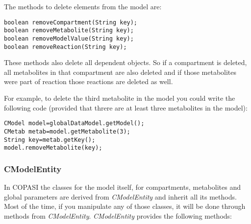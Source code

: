 \documentclass[a4,12pt]{article}
\begin{document}
The methods to delete elements from the model are:

\begin{lstlisting}
boolean removeCompartment(String key);
boolean removeMetabolite(String key);
boolean removeModelValue(String key);
boolean removeReaction(String key);
\end{lstlisting}

These methods also delete all dependent objects. So if a compartment is deleted, all metabolites in that compartment are also deleted and if those metabolites were part of reaction those reactions are deleted as well.

For example, to delete the third metabolite in the model you could write the following code (provided that threre are at least three metabolites in the model):

\begin{lstlisting}
CModel model=globalDataModel.getModel();
CMetab metab=model.getMetabolite(3);
String key=metab.getKey();
model.removeMetabolite(key);
\end{lstlisting}

\subsubsection{CModelEntity}
In COPASI the classes for the model itself, for compartments, metabolites and global parameters are derived from \textit{CModelEntity} and inherit all its methods.
Most of the time, if you manipulate any of those classes, it will be done through methods from \textit{CModelEntity}.
\textit{CModelEntity} provides the following methods:
\end{document}
